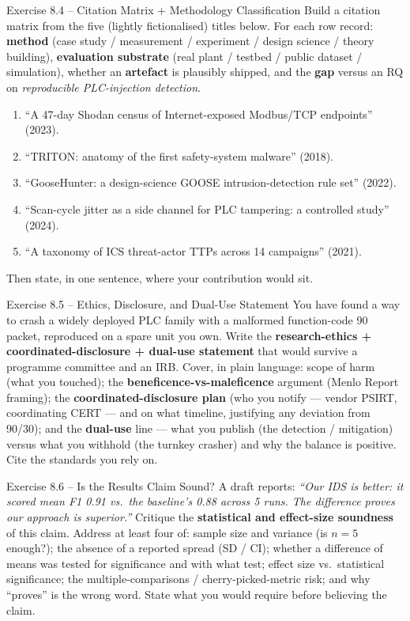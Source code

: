 \documentclass[11pt,a4paper]{article}
\begin{document}
\begin{taskbox}{Exercise 8.4 -- Citation Matrix + Methodology Classification}
Build a citation matrix from the five (lightly fictionalised) titles below. For
each row record: \textbf{method} (case study / measurement / experiment / design
science / theory building), \textbf{evaluation substrate} (real plant / testbed /
public dataset / simulation), whether an \textbf{artefact} is plausibly shipped,
and the \textbf{gap} versus an RQ on \emph{reproducible PLC-injection detection}.
\begin{enumerate}\setlength{\itemsep}{1pt}
  \item ``A 47-day Shodan census of Internet-exposed Modbus/TCP endpoints'' (2023).
  \item ``TRITON: anatomy of the first safety-system malware'' (2018).
  \item ``GooseHunter: a design-science GOOSE intrusion-detection rule set'' (2022).
  \item ``Scan-cycle jitter as a side channel for PLC tampering: a controlled study'' (2024).
  \item ``A taxonomy of ICS threat-actor TTPs across 14 campaigns'' (2021).
\end{enumerate}
Then state, in one sentence, where your contribution would sit.
\end{taskbox}

\begin{taskbox}{Exercise 8.5 -- Ethics, Disclosure, and Dual-Use Statement}
You have found a way to crash a widely deployed PLC family with a malformed
function-code 90 packet, reproduced on a spare unit you own. Write the
\textbf{research-ethics + coordinated-disclosure + dual-use statement} that would
survive a programme committee and an IRB. Cover, in plain language: scope of harm
(what you touched); the \textbf{beneficence-vs-maleficence} argument (Menlo
Report framing); the \textbf{coordinated-disclosure plan} (who you notify ---
vendor PSIRT, coordinating CERT --- and on what timeline, justifying any
deviation from 90/30); and the \textbf{dual-use} line --- what you publish (the
detection / mitigation) versus what you withhold (the turnkey crasher) and why
the balance is positive. Cite the standards you rely on.
\end{taskbox}

\begin{taskbox}{Exercise 8.6 -- Is the Results Claim Sound?}
A draft reports: \emph{``Our IDS is better: it scored mean F1 0.91 vs.\ the
baseline's 0.88 across 5 runs. The difference proves our approach is superior.''}
Critique the \textbf{statistical and effect-size soundness} of this claim. Address
at least four of: sample size and variance (is $n=5$ enough?); the absence of a
reported spread (SD / CI); whether a difference of means was tested for
significance and with what test; effect size vs.\ statistical significance; the
multiple-comparisons / cherry-picked-metric risk; and why ``proves'' is the wrong
word. State what you would require before believing the claim.
\end{taskbox}
\end{document}
